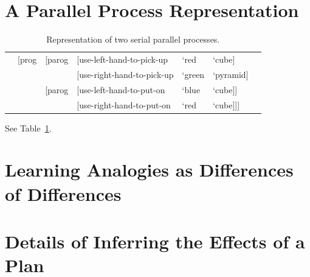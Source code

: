 \section{A Parallel Process Representation}
\label{sec:parallel_process_representation}

\begin{table}
  \myfloatalign
  \begin{tabularx}{\textwidth}{XlllllX}
    & [prog & [parog & [use-left-hand-to-pick-up  & `red   & `cube]    & \\
    &       &        & [use-right-hand-to-pick-up & `green & `pyramid] & \\
    &       & [parog & [use-left-hand-to-put-on   & `blue  & `cube]]   & \\
    &       &        & [use-right-hand-to-put-on  & `red   & `cube]]]  & \\
  \end{tabularx}
  \caption[Representation of two serial parallel processes]{Representation of two serial parallel processes.}
  \label{tab:parallel_process_representation}
\end{table}

See Table~\ref{tab:parallel_process_representation}.


\section{Learning Analogies as Differences of Differences}
\label{sec:learning_analogies_as_differences_of_differences}


\section{Details of Inferring the Effects of a Plan}
\label{sec:details_of_inferring_the_effects_of_a_plan}



